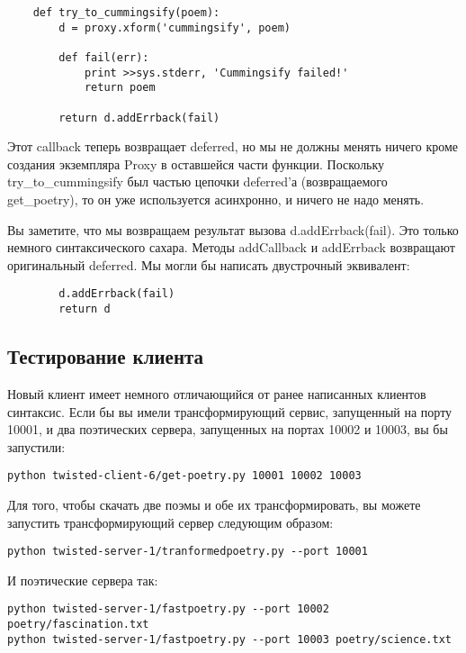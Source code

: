  \begin{verbatim}
    def try_to_cummingsify(poem):
        d = proxy.xform('cummingsify', poem)

        def fail(err):
            print >>sys.stderr, 'Cummingsify failed!'
            return poem

        return d.addErrback(fail)
\end{verbatim} 


Этот callback теперь возвращает deferred, но 
мы не должны менять 
ничего кроме создания экземпляра Proxy в
оставшейся части функции. 
Поскольку try\_to\_cummingsify был частью цепочки 
deferred'а (возвращаемого get\_poetry), 
то он уже используется асинхронно, и ничего не надо менять. 


Вы заметите, что мы возвращаем результат вызова d.addErrback(fail). 
Это только немного синтаксического сахара. Методы 
addCallback и addErrback возвращают оригинальный deferred. Мы могли 
бы написать двустрочный эквивалент:

 \begin{verbatim}
        d.addErrback(fail)
        return d
\end{verbatim} 

\subsection{Тестирование клиента}


Новый клиент имеет немного отличающийся от ранее написанных 
клиентов синтаксис. Если бы вы имели трансформирующий 
сервис, запущенный на порту 10001, и два поэтических сервера, запущенных на 
портах 10002 и 10003, вы бы запустили:

 \begin{verbatim}
python twisted-client-6/get-poetry.py 10001 10002 10003
\end{verbatim} 

Для того, чтобы скачать две поэмы и обе их трансформировать, 
вы можете запустить трансформирующий сервер следующим образом:

 \begin{verbatim}
python twisted-server-1/tranformedpoetry.py --port 10001
\end{verbatim} 

И поэтические сервера так:

 \begin{verbatim}
python twisted-server-1/fastpoetry.py --port 10002 poetry/fascination.txt
python twisted-server-1/fastpoetry.py --port 10003 poetry/science.txt
\end{verbatim} 


